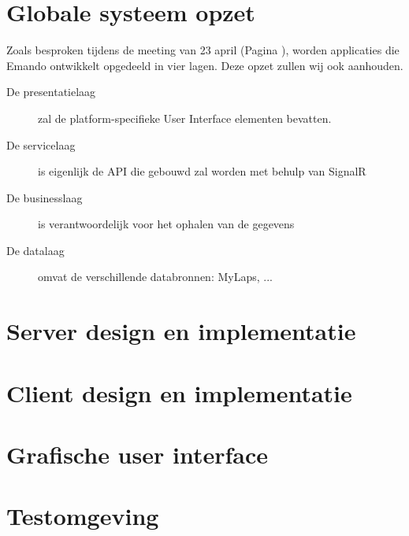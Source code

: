 \section{Globale systeem opzet}

Zoals besproken tijdens de meeting van 23 april (Pagina \pageref{sec:meeting-23-apr}), worden applicaties die Emando ontwikkelt opgedeeld in vier lagen. Deze opzet zullen wij ook aanhouden.

\begin{description}
\item[De presentatielaag] zal de platform-specifieke User Interface elementen bevatten.
\item[De servicelaag] is eigenlijk de API die gebouwd zal worden met behulp van SignalR
\item[De businesslaag] is verantwoordelijk voor het ophalen van de gegevens
\item[De datalaag] omvat de verschillende databronnen: MyLaps, ...
\end{description}
  
\section{Server design en implementatie}


\section{Client design en implementatie}


\section{Grafische user interface}


\section{Testomgeving}

